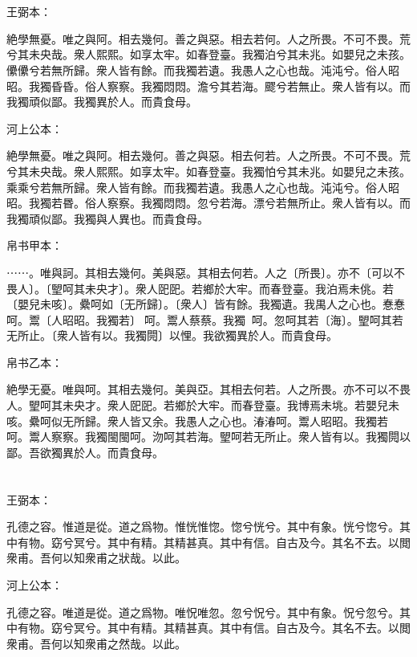 \documentclass[a5paper]{ctexbook}
\begin{document}
    \chapter{}
    王弼本：

    絶學無憂。唯之與阿。相去幾何。善之與惡。相去若何。人之所畏。不可不畏。荒兮其未央哉。衆人熙熙。如享太牢。如春登臺。我獨泊兮其未兆。如嬰兒之未孩。儽儽兮若無所歸。衆人皆有餘。而我獨若遺。我愚人之心也哉。沌沌兮。俗人昭昭。我獨昏昏。俗人察察。我獨悶悶。澹兮其若海。飂兮若無止。衆人皆有以。而我獨頑似鄙。我獨異於人。而貴食母。

    河上公本：

    絶學無憂。唯之與阿。相去幾何。善之與惡。相去何若。人之所畏。不可不畏。荒兮其未央哉。衆人熙熙。如享太牢。如春登臺。我獨怕兮其未兆。如嬰兒之未孩。乘乘兮若無所歸。衆人皆有餘。而我獨若遺。我愚人之心也哉。沌沌兮。俗人昭昭。我獨若昬。俗人察察。我獨悶悶。忽兮若海。漂兮若無所止。衆人皆有以。而我獨頑似鄙。我獨與人異也。而貴食母。

    帛书甲本：

    ⋯⋯。唯與訶。其相去幾何。美與惡。其相去何若。人之〔所畏〕。亦不〔可以不畏人〕。〔朢呵其未央才〕。衆人巸巸。若鄉於大牢。而春登臺。我泊焉未佻。若〔嬰兒未咳〕。纍呵如〔无所歸〕。〔衆人〕皆有餘。我獨遺。我禺人之心也。惷惷呵。鬻〔人昭昭。我獨若〕󱁝呵。鬻人蔡蔡。我獨𨴽𨴽呵。忽呵其若〔海〕。朢呵其若无所止。〔衆人皆有以。我獨䦎〕以悝。我欲獨異於人。而貴食母。

    帛书乙本：

    絶學无憂。唯與呵。其相去幾何。美與亞。其相去何若。人之所畏。亦不可以不畏人。朢呵其未央才。衆人巸巸。若鄉於大牢。而春登臺。我博焉未垗。若嬰兒未咳。纍呵似无所歸。衆人皆又余。我愚人之心也。湷湷呵。鬻人昭昭。我獨若𨴽呵。鬻人察察。我獨閩閩呵。沕呵其若海。朢呵若无所止。衆人皆有以。我獨䦎以鄙。吾欲獨異於人。而貴食母。

    \chapter{}
    王弼本：

    孔德之容。惟道是從。道之爲物。惟恍惟惚。惚兮恍兮。其中有象。恍兮惚兮。其中有物。窈兮冥兮。其中有精。其精甚真。其中有信。自古及今。其名不去。以閲衆甫。吾何以知衆甫之狀哉。以此。

    河上公本：

    孔德之容。唯道是從。道之爲物。唯怳唯忽。忽兮怳兮。其中有象。怳兮忽兮。其中有物。窈兮冥兮。其中有精。其精甚真。其中有信。自古及今。其名不去。以閲衆甫。吾何以知衆甫之然哉。以此。
\end{document}
